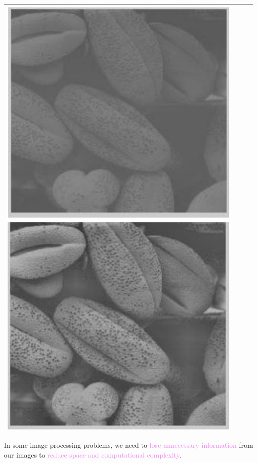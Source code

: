 \documentclass{book}
\begin{document}
\begin{center}
\begin{tabular}{|c|c|c|c|}
        \includegraphics[scale=0.25]{chapter 8/ch8_figure4.jpeg} \\
        \hline
    \end{tabular}
\end{center}
In some image processing problems, we need to \textcolor{violet}{lose unnecessary information} from our images to \textcolor{violet}{reduce space and computational complexity}.\\
\end{document}
